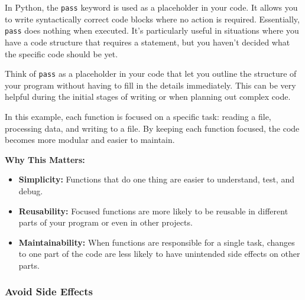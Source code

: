 \documentclass[
  letterpaper,
  DIV=11,
  numbers=noendperiod]{scrreprt}
\providecommand{\tightlist}{%
  \setlength{\itemsep}{0pt}\setlength{\parskip}{0pt}}\usepackage{longtable,booktabs,array}
\begin{document}
\begin{tcolorbox}[enhanced jigsaw, coltitle=black, colback=white, bottomrule=.15mm, arc=.35mm, titlerule=0mm, opacitybacktitle=0.6, toptitle=1mm, left=2mm, toprule=.15mm, opacityback=0, bottomtitle=1mm, title=\textcolor{quarto-callout-note-color}{\faInfo}\hspace{0.5em}{\texttt{pass}}, rightrule=.15mm, colframe=quarto-callout-note-color-frame, breakable, colbacktitle=quarto-callout-note-color!10!white, leftrule=.75mm]

In Python, the \texttt{pass} keyword is used as a placeholder in your
code. It allows you to write syntactically correct code blocks where no
action is required. Essentially, \texttt{pass} does nothing when
executed. It's particularly useful in situations where you have a code
structure that requires a statement, but you haven't decided what the
specific code should be yet.

Think of \texttt{pass} as a placeholder in your code that let you
outline the structure of your program without having to fill in the
details immediately. This can be very helpful during the initial stages
of writing or when planning out complex code.

\end{tcolorbox}

In this example, each function is focused on a specific task: reading a
file, processing data, and writing to a file. By keeping each function
focused, the code becomes more modular and easier to maintain.

\textbf{Why This Matters:}

\begin{itemize}
\tightlist
\item
  \textbf{Simplicity:} Functions that do one thing are easier to
  understand, test, and debug.
\item
  \textbf{Reusability:} Focused functions are more likely to be reusable
  in different parts of your program or even in other projects.
\item
  \textbf{Maintainability:} When functions are responsible for a single
  task, changes to one part of the code are less likely to have
  unintended side effects on other parts.
\end{itemize}

\hypertarget{avoid-side-effects}{%
\subsubsection{Avoid Side Effects}\label{avoid-side-effects}}
\end{document}

